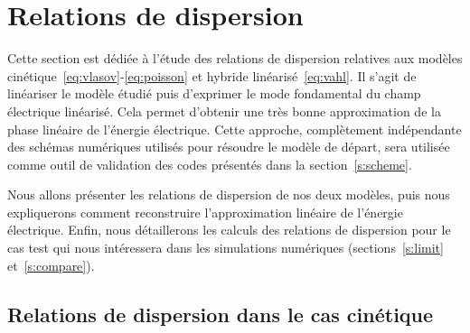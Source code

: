 
\section{Relations de dispersion}
\label{s:dispersion}

Cette section est dédiée à l'étude des relations de dispersion relatives aux modèles cinétique~\eqref{eq:vlasov}-\eqref{eq:poisson} et hybride linéarisé~\eqref{eq:vahl}. Il s'agit de linéariser le modèle étudié puis d'exprimer le mode fondamental du champ électrique linéarisé. Cela permet d'obtenir une très bonne approximation de la phase linéaire de l'énergie électrique. Cette approche, complètement indépendante des schémas numériques utilisés pour résoudre le modèle de départ, sera utilisée comme outil de validation des codes présentés dans la section~\ref{s:scheme}.

Nous allons présenter les relations de dispersion de nos deux modèles, puis nous expliquerons comment reconstruire l'approximation linéaire de l'énergie électrique. Enfin, nous détaillerons les calculs des relations de dispersion pour le cas test qui nous intéressera dans les simulations numériques (sections~\ref{s:limit} et~\ref{s:compare}).

\subsection{Relations de dispersion dans le cas cinétique}

